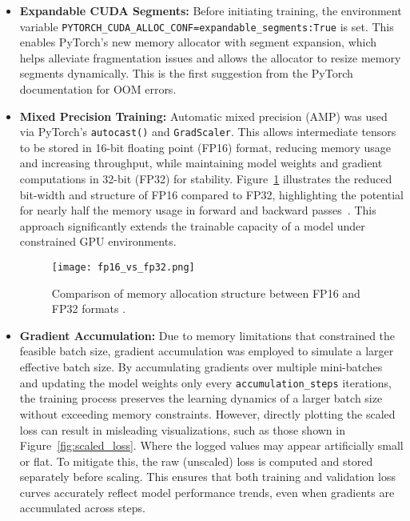 \begin{itemize}
    \item \textbf{Expandable CUDA Segments:} Before initiating training, the environment variable \texttt{PYTORCH\_CUDA\_ALLOC\_CONF=expandable\_segments:True} is set. This enables PyTorch’s new memory allocator with segment expansion, which helps alleviate fragmentation issues and allows the allocator to resize memory segments dynamically. This is the first suggestion from the PyTorch documentation for OOM errors.

    \item \textbf{Mixed Precision Training:} Automatic mixed precision (AMP) was used via PyTorch’s \texttt{autocast()} and \texttt{GradScaler}. This allows intermediate tensors to be stored in 16-bit floating point (FP16) format, reducing memory usage and increasing throughput, while maintaining model weights and gradient computations in 32-bit (FP32) for stability. Figure~\ref{fig:fp16_vs_fp32} illustrates the reduced bit-width and structure of FP16 compared to FP32, highlighting the potential for nearly half the memory usage in forward and backward passes~\cite{mindspore_mixed_precision}. This approach significantly extends the trainable capacity of a model under constrained GPU environments.

    \begin{figure}[H]
        \centering
        \texttt{[image: fp16\_vs\_fp32.png]}
        \caption{Comparison of memory allocation structure between FP16 and FP32 formats \cite{mindspore_mixed_precision}.}
        \label{fig:fp16_vs_fp32}
    \end{figure}

    \item \textbf{Gradient Accumulation:} Due to memory limitations that constrained the feasible batch size, gradient accumulation was employed to simulate a larger effective batch size. By accumulating gradients over multiple mini-batches and updating the model weights only every \texttt{accumulation\_steps} iterations, the training process preserves the learning dynamics of a larger batch size without exceeding memory constraints. However, directly plotting the scaled loss can result in misleading visualizations, such as those shown in Figure~\ref{fig:scaled_loss}. Where the logged values may appear artificially small or flat. To mitigate this, the raw (unscaled) loss is computed and stored separately before scaling. This ensures that both training and validation loss curves accurately reflect model performance trends, even when gradients are accumulated across steps.


\end{itemize}
